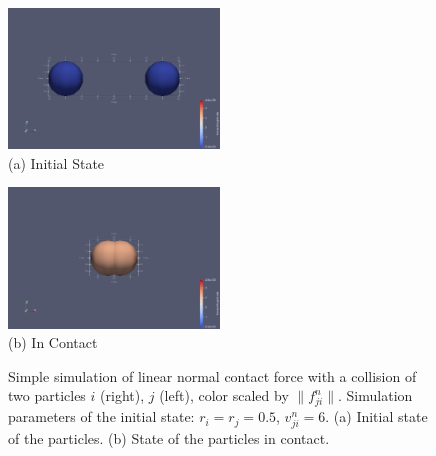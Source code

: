\documentclass[11pt,
               a4paper,
               bibtotoc,
               idxtotoc,
               headsepline,
               footsepline,
               footexclude,
               BCOR12mm,
               DIV13,
               openany,   %
               ]
               {scrbook}
\begin{document}
\begin{figure}[H]
	\centering
	\begin{center}
		\includegraphics[width=0.5\textwidth]{figures/contactForceLaws/linearNormalContactModel/simple_collision_two_particles_centered.0000.png}
		\\ (a) Initial State %
	\end{center}
	
	\begin{center}
		\includegraphics[width=0.5\textwidth]{figures/contactForceLaws/linearNormalContactModel/simple_collision_two_particles_centered.0044.png}
		\\ (b) In Contact %
	\end{center}
	
	\caption[Combined Caption]{Simple simulation of linear normal contact force with a collision of two particles $i$ (right), $j$ (left), color scaled by $\lVert f^n_{ji} \rVert$. Simulation parameters of the initial state: $r_i = r_j = 0.5$, $v^n_{ji} = 6$. (a) Initial state of the particles. (b) State of the particles in contact.}
	\label{fig:combined_linear_normal_contact_model}
\end{figure}
\end{document}

